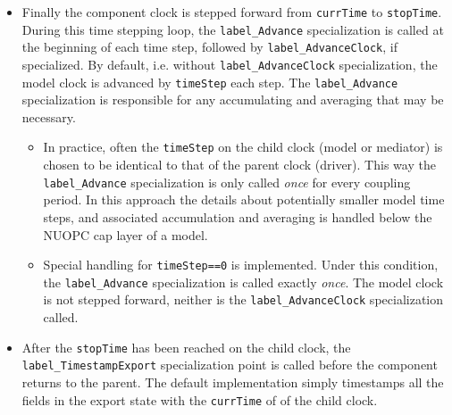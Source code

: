 \begin{itemize}
\begin{itemize}
\end{itemize}
\item Finally the component clock is stepped forward from {\tt currTime} to {\tt stopTime}. During this time stepping loop, the {\tt label\_Advance} specialization is called at the beginning of each time step, followed by {\tt label\_AdvanceClock}, if specialized. By default, i.e. without {\tt label\_AdvanceClock} specialization, the model clock is advanced by {\tt timeStep} each step. The {\tt label\_Advance} specialization is responsible for any accumulating and averaging that may be necessary.
\begin{itemize}
\item In practice, often the {\tt timeStep} on the child clock (model or mediator) is chosen to be identical to that of the parent clock (driver). This way the {\tt label\_Advance} specialization is only called {\em once} for every coupling period. In this approach the details about potentially smaller model time steps, and associated accumulation and averaging is handled below the NUOPC cap layer of a model.
\item Special handling for {\tt timeStep==0} is implemented. Under this condition, the {\tt label\_Advance} specialization is called exactly {\em once}. The model clock is not stepped forward, neither is the {\tt label\_AdvanceClock} specialization called.
\end{itemize}
\item After the {\tt stopTime} has been reached on the child clock, the {\tt label\_TimestampExport} specialization point is called before the component returns to the parent. The default implementation simply timestamps all the fields in the export state with the {\tt currTime} of of the child clock.
\end{itemize}


